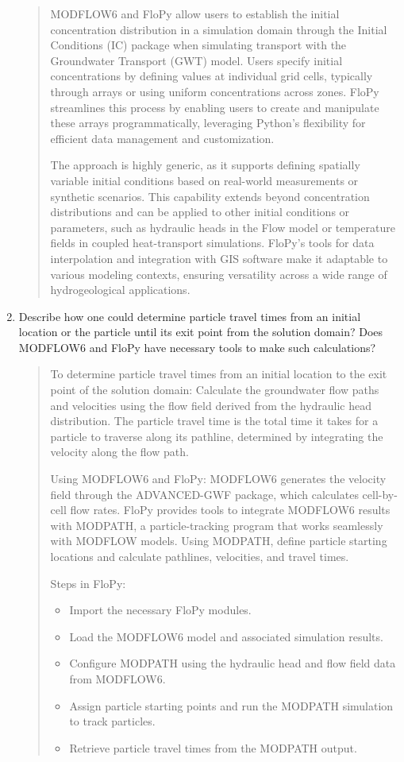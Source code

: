 \documentclass[12pt]{article}
\begin{document}
\begin{enumerate}
\begin{quote}
MODFLOW6 and FloPy allow users to establish the initial concentration distribution in a simulation domain through the Initial Conditions (IC) package when simulating transport with the Groundwater Transport (GWT) model. Users specify initial concentrations by defining values at individual grid cells, typically through arrays or using uniform concentrations across zones. FloPy streamlines this process by enabling users to create and manipulate these arrays programmatically, leveraging Python's flexibility for efficient data management and customization.

The approach is highly generic, as it supports defining spatially variable initial conditions based on real-world measurements or synthetic scenarios. This capability extends beyond concentration distributions and can be applied to other initial conditions or parameters, such as hydraulic heads in the Flow model or temperature fields in coupled heat-transport simulations. FloPy's tools for data interpolation and integration with GIS software make it adaptable to various modeling contexts, ensuring versatility across a wide range of hydrogeological applications.
\end{quote}
\clearpage

\item Describe how one could determine particle travel times from an initial location or the particle until its exit point from the solution domain?  Does MODFLOW6 and FloPy have necessary tools to make such calculations?  

\begin{quote}
To determine particle travel times from an initial location to the exit point of the solution domain: Calculate the groundwater flow paths and velocities using the flow field derived from the hydraulic head distribution. The particle travel time is the total time it takes for a particle to traverse along its pathline, determined by integrating the velocity along the flow path.

Using MODFLOW6 and FloPy: MODFLOW6 generates the velocity field through the ADVANCED-GWF package, which calculates cell-by-cell flow rates. FloPy provides tools to integrate MODFLOW6 results with MODPATH, a particle-tracking program that works seamlessly with MODFLOW models. Using MODPATH, define particle starting locations and calculate pathlines, velocities, and travel times.

Steps in FloPy:
\begin{itemize}
\item Import the necessary FloPy modules.
\item Load the MODFLOW6 model and associated simulation results.
\item Configure MODPATH using the hydraulic head and flow field data from MODFLOW6.
\item Assign particle starting points and run the MODPATH simulation to track particles.
\item Retrieve particle travel times from the MODPATH output.
\end{itemize}
\end{quote}
\clearpage


\end{enumerate}
\end{document}
